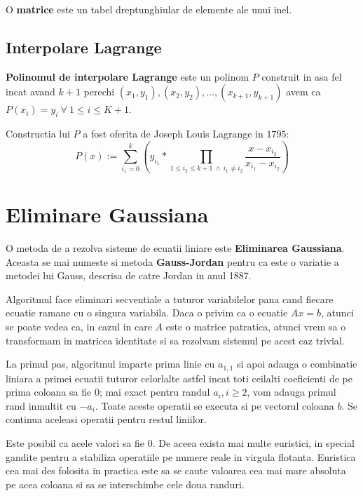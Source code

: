 \begin{defn}
  O \textbf{matrice} este un tabel dreptunghiular de elemente ale unui inel.
\end{defn}

\subsection{Interpolare Lagrange}

\textbf{Polinomul de interpolare Lagrange} este un polinom $P$ construit in asa
fel incat avand $k + 1$ perechi
$(x_{1}, y_{1}), (x_{2}, y_{2}), \ldots, (x_{k+1}, y_{k+1})$ avem ca
$P(x_{i}) = y_{i}\ \forall\ 1 \leq i \leq K + 1$. \par
Constructia lui $P$ a fost oferita de Joseph Louis Lagrange in $1795$:
\begin{equation}
  P(x) := \displaystyle\sum\limits_{i_{1}=0}^{k} (y_{i_{1}} * \prod_{1 \leq i_{2} \leq k + 1 \ \land \ i_{1} \neq i_{2}} \frac{x - x_{i_{2}}}{x_{i_{1}} - x_{i_{2}}})
\end{equation}

\section{Eliminare Gaussiana}
\label{gauss}

O metoda de a rezolva sisteme de ecuatii liniare este \textbf{Eliminarea Gaussiana}.
Aceasta se mai numeste si metoda \textbf{Gauss-Jordan} pentru ca este o variatie a
metodei lui Gauss, descrisa de catre Jordan in anul 1887.

Algoritmul face eliminari secventiale a tuturor variabilelor pana cand fiecare ecuatie
ramane cu o singura variabila. Daca o privim ca o ecuatie $Ax = b$, atunci se poate
vedea ca, in cazul in care $A$ este o matrice patratica, atunci vrem sa o transformam
in matricea identitate si sa rezolvam sistemul pe acest caz trivial.

La primul pas, algoritmul imparte prima linie cu $a_{1, 1}$ si apoi adauga o combinatie
liniara a primei ecuatii tuturor celorlalte astfel incat toti ceilalti coeficienti de pe
prima coloana sa fie $0$; mai exact pentru randul $a_{i}, i \geq 2$, vom adauga primul rand
inmultit cu $-a_{i}$. Toate aceste operatii se executa si pe vectorul coloana $b$. Se
continua aceleasi operatii pentru restul liniilor.

Este posibil ca acele valori sa fie $0$. De aceea exista mai multe euristici, in special gandite
pentru a stabiliza operatiile pe numere reale in virgula flotanta. Euristica cea mai des folosita
in practica este sa se caute valoarea cea mai mare absoluta pe acea coloana si sa se interschimbe
cele doua randuri.

